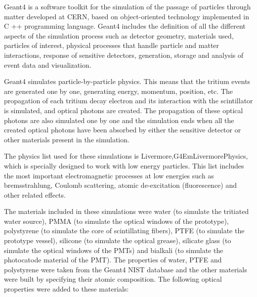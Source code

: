 Geant4 is a software toolkit for the simulation of the passage of particles through matter developed at CERN, based on object-oriented technology implemented in C ++ programming language. Geant4 includes the definition of all the different aspects of the simulation process such as detector geometry, materials used, particles of interest, physical processes that handle particle and matter interactions, response of sensitive detectors, generation, storage and analysis of event data and visualization.

Geant4 simulates particle-by-particle physics. This means that the tritium events are generated one by one, generating energy, momentum, position, etc. The propagation of each tritium decay electron and its interaction  with the scintillator is simulated, and optical photons are created. The propagation of these optical photons are also simulated one by one and the simulation ends when all the created optical photons have been absorbed by either the sensitive detector or other materials present in the simulation. 

The physics list used for these simulations is Livermore,\newline G4EmLivermorePhysics, which is specially designed to work with low energy particles. This list includes the most important electromagnetic processes at low energies such as bremsstrahlung, Coulomb scattering, atomic de-excitation (fluorescence) and other related effects. 

The materials included in these simulations were water (to simulate the tritiated water source), PMMA (to simulate the optical windows of the prototype), polystyrene (to simulate the core of scintillating fibers), PTFE (to simulate the prototype vessel), silicone (to simulate the optical grease), silicate glass (to simulate the optical windows of the PMTs) and bialkali (to simulate the photocatode material of the PMT). The properties of water, PTFE and polystyrene were taken from the Geant4 NIST database and the other materials were built by specifying their atomic composition. The following optical properties were added to these materials:

